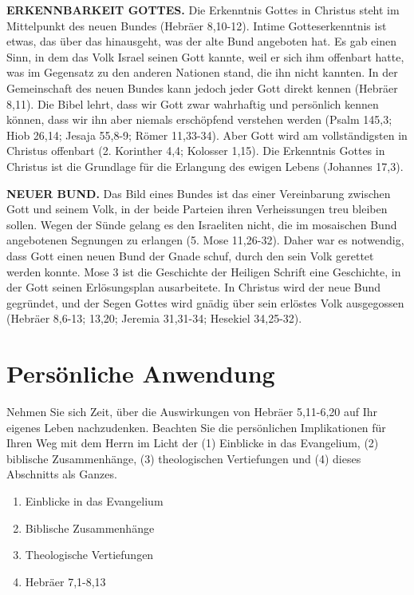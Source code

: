 \documentclass[
  12pt,
]{krantz}
\providecommand{\tightlist}{%
  \setlength{\itemsep}{0pt}\setlength{\parskip}{0pt}}
\begin{document}
\textbf{ERKENNBARKEIT GOTTES.} Die Erkenntnis Gottes in Christus steht im Mittelpunkt des neuen Bundes (Hebräer 8,10-12). Intime Gotteserkenntnis ist etwas, das über das hinausgeht, was der alte Bund angeboten hat. Es gab einen Sinn, in dem das Volk Israel seinen Gott kannte, weil er sich ihm offenbart hatte, was im Gegensatz zu den anderen Nationen stand, die ihn nicht kannten. In der Gemeinschaft des neuen Bundes kann jedoch jeder Gott direkt kennen (Hebräer 8,11). Die Bibel lehrt, dass wir Gott zwar wahrhaftig und persönlich kennen können, dass wir ihn aber niemals erschöpfend verstehen werden (Psalm 145,3; Hiob 26,14; Jesaja 55,8-9; Römer 11,33-34). Aber Gott wird am vollständigsten in Christus offenbart (2. Korinther 4,4; Kolosser 1,15). Die Erkenntnis Gottes in Christus ist die Grundlage für die Erlangung des ewigen Lebens (Johannes 17,3).

\textbf{NEUER BUND.} Das Bild eines Bundes ist das einer Vereinbarung zwischen Gott und seinem Volk, in der beide Parteien ihren Verheissungen treu bleiben sollen. Wegen der Sünde gelang es den Israeliten nicht, die im mosaischen Bund angebotenen Segnungen zu erlangen (5. Mose 11,26-32). Daher war es notwendig, dass Gott einen neuen Bund der Gnade schuf, durch den sein Volk gerettet werden konnte. Mose 3 ist die Geschichte der Heiligen Schrift eine Geschichte, in der Gott seinen Erlösungsplan ausarbeitete. In Christus wird der neue Bund gegründet, und der Segen Gottes wird gnädig über sein erlöstes Volk ausgegossen (Hebräer 8,6-13; 13,20; Jeremia 31,31-34; Hesekiel 34,25-32).

\hypertarget{persuxf6nliche-anwendung}{%
\section{Persönliche Anwendung}\label{persuxf6nliche-anwendung}}

Nehmen Sie sich Zeit, über die Auswirkungen von Hebräer 5,11-6,20 auf Ihr eigenes Leben nachzudenken. Beachten Sie die persönlichen Implikationen für Ihren Weg mit dem Herrn im Licht der (1) Einblicke in das Evangelium, (2) biblische Zusammenhänge, (3) theologischen Vertiefungen und (4) dieses Abschnitts als Ganzes.

\begin{enumerate}
\def\labelenumi{\arabic{enumi}.}
\tightlist
\item
  Einblicke in das Evangelium
\item
  Biblische Zusammenhänge
\item
  Theologische Vertiefungen
\item
  Hebräer 7,1-8,13
\end{enumerate}
\end{document}
